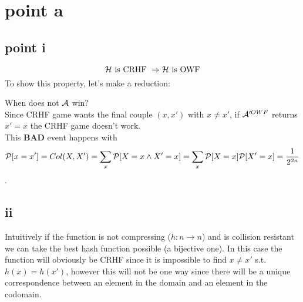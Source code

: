 
\section{point a}
\subsection{point i}%

\[
    \H \text{ is CRHF } \Rightarrow \H \text{ is OWF}
\]
To show this property, let's make a reduction:
\begin{figure}[h!]
   \centering
   \sdinit{}
\end{figure}

When does not $\A$ win?\\
Since CRHF game  wants the final couple $(x, x')$ with $x\not= x'$, if
$\A'^{OWF}$ returns $x'=x$ the CRHF game doesn't work.\\

This \textbf{BAD} event happens with 
\[
    \P [ x=x' ]=Col(X, X')=\sum_{x}^{} \P [ X=x \wedge X'=x ]= \sum_{x}^{} \P [X=x] \P [ X'=x ] = \frac{1}{2^{2n}}        
\].

\subsection{ii}%

Intuitively if the function is not compressing ($h:n \to n$) and is collision resistant we can take the best hash function possible (a bijective one). In this case the function will obviously be CRHF since it is impossible to find $x\neq x'$ s.t. $h(x)=h(x')$, however this will not be one way since there will be a unique correspondence between an element in the domain and an element in the codomain.

